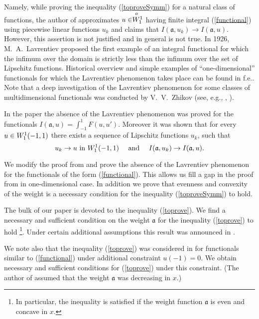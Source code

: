 Namely, while proving the inequality (\ref{toproveSymm}) for a natural class of functions,
the author of \cite{Br} approximates $u \in \stackrel{o\ }{W_1^1}$ having finite integral (\ref{functional})
using piecewise linear functions $u_k$ and claims that $I(\mathfrak a, u_k) \to I(\mathfrak a, u)$.
However, this assertion is not justified and in general is not true.
In 1926, M.~A.~Lavrentiev proposed the first example of an integral functional
for which the infimum over the domain is strictly less than the infimum over the set of 
Lipschitz functions.
Historical overview and simple examples of ``one-dimensional'' 
functionals for which the Lavrentiev phenomenon takes place can be found in \cite{BGH} f.e..
Note that a deep investigation of the Lavrentiev phenomenon for some classes of multidimensional 
functionals was conducted by V.~V.~Zhikov (see, e.g., \cite{Zh1}, \cite{Zh2}).

In the paper \cite{ASC} the absence of the Lavrentiev phenomenon was proved for the functionals
$I(\mathfrak a, u) = \int_{-1}^1 F(u, u')$. Moreover it was shown that for every $u \in W_1^1(-1, 1)$ 
there exists a sequence of Lipschitz functions $u_k$, such that
\begin{equation}
\label{convergence}
u_k \to u \text{ in } \W (-1, 1) \quad \text{ and } \quad I (\mathfrak a, u_k) \to I (\mathfrak a, u).
\end{equation}

We modify the proof from \cite{ASC} and prove the absence of the Lavrentiev phenomenon
for the functionals of the form (\ref{functional}).
This allows us fill a gap in the proof from \cite{Br} in one-dimensional case.
In addition we prove that evenness and convexity of the weight is a necessary condition
for the inequality (\ref{toproveSymm}) to hold.

The bulk of our paper is devoted to the inequality (\ref{toprove}).
We find a necessary and sufficient condition on the weight $\mathfrak a$ for the inequality 
(\ref{toprove}) to hold%
\footnote{In particular, the inequality is satisfied if the weight function $\mathfrak a$ is even 
and concave in $x$.}.
Under certain additional assumptions this result was announced in \cite{DAN}.

We note also that the inequality (\ref{toprove}) was considered in \cite{Lan}
for functionals similar to (\ref{functional}) under additional constraint $u(-1) = 0$.
We obtain necessary and sufficient conditions for (\ref{toprove}) under this constraint.
(The author of \cite{Lan} assumed that the weight $\mathfrak a$ was decreasing in $x$.)


